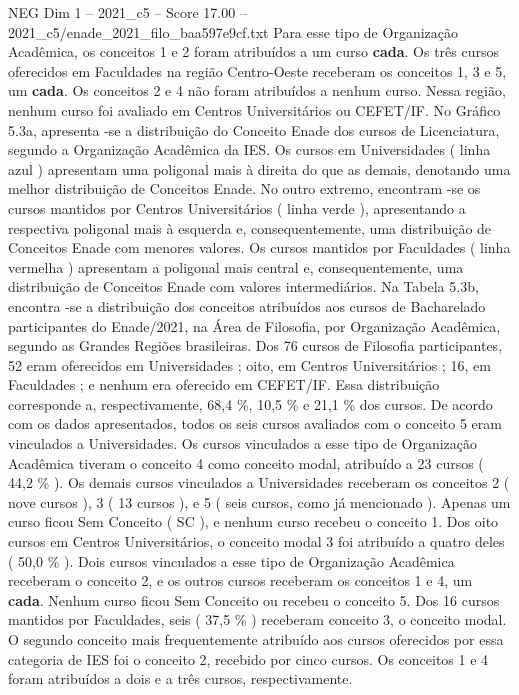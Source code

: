 \begin{textsample}{NEG Dim 1 – 2021\_c5 – Score 17.00 – 2021\_c5/enade\_2021\_filo\_baa597e9cf.txt}
Para esse tipo de Organização Acadêmica, os conceitos 1 e 2 foram atribuídos a um curso \textbf{cada}.
Os três cursos oferecidos em Faculdades na região Centro-Oeste receberam os conceitos 1, 3 e 5, um \textbf{cada}.
Os conceitos 2 e 4 não foram atribuídos a nenhum curso.
Nessa região, nenhum curso foi avaliado em Centros Universitários ou CEFET/IF.
No Gráfico 5.3a, apresenta -se a distribuição do Conceito Enade dos cursos de Licenciatura, segundo a Organização Acadêmica da IES.
Os cursos em Universidades ( linha azul ) apresentam uma poligonal mais à direita do que as demais, denotando uma melhor distribuição de Conceitos Enade.
No outro extremo, encontram -se os cursos mantidos por Centros Universitários ( linha verde ), apresentando a respectiva poligonal mais à esquerda e, consequentemente, uma distribuição de Conceitos Enade com menores valores.
Os cursos mantidos por Faculdades ( linha vermelha ) apresentam a poligonal mais central e, consequentemente, uma distribuição de Conceitos Enade com valores intermediários.
Na Tabela 5.3b, encontra -se a distribuição dos conceitos atribuídos aos cursos de Bacharelado participantes do Enade/2021, na Área de Filosofia, por Organização Acadêmica, segundo as Grandes Regiões brasileiras.
Dos 76 cursos de Filosofia participantes, 52 eram oferecidos em Universidades ; oito, em Centros Universitários ; 16, em Faculdades ; e nenhum era oferecido em CEFET/IF.
Essa distribuição corresponde a, respectivamente, 68,4 \%, 10,5 \% e 21,1 \% dos cursos.
De acordo com os dados apresentados, todos os seis cursos avaliados com o conceito 5 eram vinculados a Universidades.
Os cursos vinculados a esse tipo de Organização Acadêmica tiveram o conceito 4 como conceito modal, atribuído a 23 cursos ( 44,2 \% ).
Os demais cursos vinculados a Universidades receberam os conceitos 2 ( nove cursos ), 3 ( 13 cursos ), e 5 ( seis cursos, como já mencionado ).
Apenas um curso ficou Sem Conceito ( SC ), e nenhum curso recebeu o conceito 1.
Dos oito cursos em Centros Universitários, o conceito modal 3 foi atribuído a quatro deles ( 50,0 \% ).
Dois cursos vinculados a esse tipo de Organização Acadêmica receberam o conceito 2, e os outros cursos receberam os conceitos 1 e 4, um \textbf{cada}.
Nenhum curso ficou Sem Conceito ou recebeu o conceito 5.
Dos 16 cursos mantidos por Faculdades, seis ( 37,5 \% ) receberam conceito 3, o conceito modal.
O segundo conceito mais frequentemente atribuído aos cursos oferecidos por essa categoria de IES foi o conceito 2, recebido por cinco cursos.
Os conceitos 1 e 4 foram atribuídos a dois e a três cursos, respectivamente.

\end{textsample}
